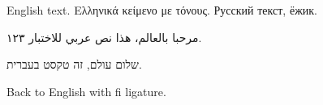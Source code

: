 \documentclass{article}
\begin{document}
English text. \textgreek{Ελληνικά κείμενο με τόνους.} \textrussian{Русский текст, ёжик.}

\begin{arabic}
مرحبا بالعالم، هذا نص عربي للاختبار ١٢٣.
\end{arabic}

\begin{hebrew}
שלום עולם, זה טקסט בעברית.
\end{hebrew}
Back to English with fi ligature.
\end{document}
